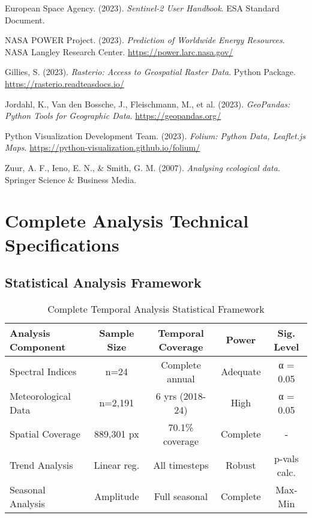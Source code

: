 \documentclass[a4paper,12pt]{article}
\begin{document}
\begin{thebibliography}{99}

    European Space Agency. (2023). \textit{Sentinel-2 User Handbook}. ESA Standard Document.

    NASA POWER Project. (2023). \textit{Prediction of Worldwide Energy Resources}. NASA Langley Research Center. \url{https://power.larc.nasa.gov/}

    Gillies, S. (2023). \textit{Rasterio: Access to Geospatial Raster Data}. Python Package. \url{https://rasterio.readteasdocs.io/}

    Jordahl, K., Van den Bossche, J., Fleischmann, M., et al. (2023). \textit{GeoPandas: Python Tools for Geographic Data}. \url{https://geopandas.org/}

    Python Visualization Development Team. (2023). \textit{Folium: Python Data, Leaflet.js Maps}. \url{https://python-visualization.github.io/folium/}

    Zuur, A. F., Ieno, E. N., \& Smith, G. M. (2007). \textit{Analysing ecological data}. Springer Science \& Business Media.

\end{thebibliography}

\newpage
\appendix

\section{Complete Analysis Technical Specifications}

\subsection{Statistical Analysis Framework}

\begin{table}[H]
    \centering
    \caption{Complete Temporal Analysis Statistical Framework}
    \begin{tabular}{@{}lcccc@{}}
        \toprule
        Analysis Component & Sample Size & Temporal Coverage & Power & Sig. Level \\
        \midrule
        Spectral Indices & n=24 & Complete annual & Adequate & α = 0.05 \\
        Meteorological Data & n=2,191 & 6 yrs (2018-24) & High & α = 0.05 \\
        Spatial Coverage & 889,301 px & 70.1\% coverage & Complete & - \\
        Trend Analysis & Linear reg. & All timesteps & Robust & p-vals calc. \\
        Seasonal Analysis & Amplitude & Full seasonal & Complete & Max-Min \\
        \bottomrule
    \end{tabular}
\end{table}
\end{document}
